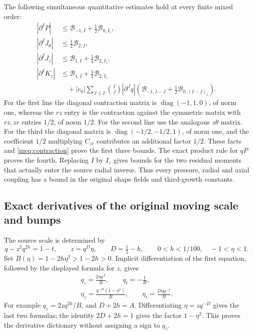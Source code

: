 The following simultaneous quantitative estimates hold at every finite
mixed order:
\begin{equation}\label{mcq:defect_bounds}
\begin{split}
 |\partial^IP|&\le
       \mathcal B_{-1,I}+\tfrac12\mathcal B_{0,I_z},\\
 |\partial^IJ_\theta|&\le\tfrac12\mathcal B_{2,I},\\
 |\partial^IJ_z|&\le
       \mathcal B_{1,I}+\tfrac14\mathcal B_{2,I_z},\\
 |\partial^IK_z|&\le
       \mathcal B_{1,I}+\tfrac14\mathcal B_{2,I_z}\\
 &\quad+|c_0|\sum_{J\le I}\binom IJ
       |\partial^Jq|\left(
       \mathcal B_{-1,I-J}+\tfrac12\mathcal B_{0,(I-J)_z}\right).
\end{split}
\end{equation}
For the first line the diagonal contraction matrix is
\(\operatorname{diag}(-1,1,0)\), of norm one, whereas the \(rz\)
entry is the contraction against the symmetric matrix with \(rz,zr\)
entries \(1/2\), of norm \(1/2\). For the second line use the
analogous \(z\theta\) matrix. For the third the diagonal matrix is
\(\operatorname{diag}(-1/2,-1/2,1)\), of norm one, and the
coefficient \(1/2\) multiplying \(C_{zr}\) contributes an additional
factor \(1/2\). These facts and \eqref{mcq:contraction} prove the first
three bounds. The exact product rule for \(qP\) proves the fourth.
Replacing \(I\) by \(I_z\) gives bounds for the two residual moments
that actually enter the source radial inverse. Thus every pressure,
radial and axial coupling has a bound in the original shape fields
and third-growth constants.

\subsection{Exact derivatives of the original moving scale and bumps}

The source scale is determined by
\[
 q-z^2q^{2h}=1-t,\qquad z=q^D\eta,\qquad
 D=\tfrac12-h,\qquad 0<h<1/100,\quad -1<\eta<1 .
\]
Set \(B(\eta)=1-2h\eta^2>1-2h>0\). Implicit differentiation of the
first equation, followed by the displayed formula for \(z\), gives
\begin{equation}\label{mcq:q_derivatives}
\begin{gathered}
 q_z=\frac{2\eta q^A}{B},\qquad q_t=-\frac1B,\\
 \eta_z=\frac{q^{-D}(1-\eta^2)}B,\qquad
 \eta_t=\frac{D\eta q^{-1}}B .
\end{gathered}
\end{equation}
For example \(q_z=2zq^{2h}/B\), and \(D+2h=A\).
Differentiating \(\eta=zq^{-D}\) gives the last two formulas;
the identity \(2D+2h=1\) gives the factor \(1-\eta^2\).
This proves the derivative dictionary without assigning a sign to \(q_z\).

